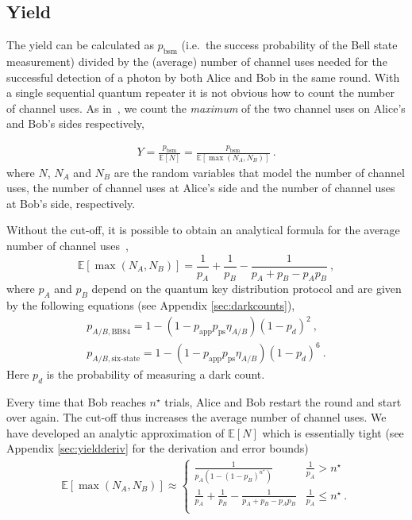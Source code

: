 \documentclass[aps,pra,reprint,superscriptaddress]{revtex4-1}
\newcommand{\nstar}{n^{\star}}
\begin{document}
\subsection*{Yield}
The yield can be calculated as $p_{\textrm{bsm}}$ (i.e.~the success probability of the Bell state measurement) divided by the (average) 
number of channel uses needed for the successful detection of a photon by both Alice and Bob in the same round. With a single sequential quantum repeater it is not obvious how to count the number of channel uses. As in~\cite{luong2015overcoming}, we count the \emph{maximum} of the two channel uses on Alice's and Bob's sides respectively,

\begin{align}
Y = \frac{p_{\textrm{bsm}}}{\mathbb{E}\left[N\right]} = \frac{p_{\textrm{bsm}}}{\mathbb{E}\left[\max(N_A, N_B)\right]}\label{eq:yielddefinition}\ .
\end{align}
where $N$, $N_A$ and $N_B$ are the random variables that model the number of channel uses, the number of channel uses at Alice's side and the number of channel uses at Bob's side, respectively.

Without the cut-off, it is possible to obtain an analytical formula for the average number of channel uses~\cite{panayi2014memory, luong2015overcoming},
\begin{equation}
\mathbb{E}\left[\max(N_A, N_B)\right] =
       \frac{1}{p_A}+\frac{1}{p_B}-\frac{1}{p_A+p_B-p_Ap_B}\ ,
\end{equation} 
where $p_A$ and $p_B$ depend on the quantum key distribution protocol and are given by the following equations (see Appendix \ref{sec:darkcounts}),
\begin{align}
p_{A/B,\textrm{BB84}} = 1 - (1-p_{\textrm{app}} p_{\textrm{ps}}\eta_{A/B})(1-p_d)^2\ , \label{eq:ps1} \\
p_{A/B,\textrm{six-state}} = 1 - (1-p_{\textrm{app}} p_{\textrm{ps}}\eta_{A/B})(1-p_d)^6\ .
\label{eq:ps2}
\end{align}
Here $p_d$ is the probability of measuring a dark count.

Every time that Bob reaches $\nstar$ trials, Alice and Bob restart the round and start over again. The cut-off thus increases the average number of channel uses. We have developed an analytic approximation of $\mathbb{E}\left[N\right]$ which is essentially tight (see Appendix \ref{sec:yieldderiv} for the derivation and error bounds)
\begin{align}
\mathbb{E}\left[\max(N_A, N_B)\right] \approx  \left\{
\begin{array}{ll}
      \frac{1}{p_A\left(1-\left(1-p_B\right)^{\nstar}\right)} & \frac{1}{p_A}> \nstar \\
       \frac{1}{p_A}+\frac{1}{p_B}-\frac{1}{p_A+p_B-p_Ap_B} & \frac{1}{p_A}\leq\nstar\ . \\
\end{array} 
\right.
\end{align}
\end{document}
